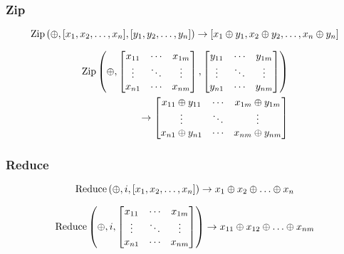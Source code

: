 \subsubsection{Zip}

\begin{equation}
\operatorname*{Zip}\left( \oplus, [x_1,x_2,\ldots,x_n], [y_1,y_2,\ldots,y_n] \right)
\to
\left[ x_1 \oplus y_1, x_2 \oplus y_2, \ldots, x_n \oplus y_n \right]
\end{equation}

\begin{equation}
\begin{split}
\operatorname*{Zip} \left( \oplus,
\begin{bmatrix}
  x_{11} & \cdots & x_{1m} \\
  \vdots & \ddots & \vdots \\
  x_{n1} & \cdots & x_{nm}
\end{bmatrix},
\begin{bmatrix}
  y_{11} & \cdots & y_{1m} \\
  \vdots & \ddots & \vdots \\
  y_{n1} & \cdots & y_{nm}
\end{bmatrix} \right) \\
\to
\begin{bmatrix}
  x_{11} \oplus y_{11} & \cdots & x_{1m} \oplus y_{1m} \\
  \vdots & \ddots & \vdots \\
  x_{n1} \oplus y_{n1} & \cdots & x_{nm} \oplus y_{nm}
\end{bmatrix}
\end{split}
\end{equation}

\subsubsection{Reduce}

\begin{equation}
\operatorname*{Reduce} \left( \oplus, i, [x_1,x_2,\ldots,x_n] \right)
\to
x_1 \oplus x_2 \oplus \ldots \oplus x_n
\end{equation}

\begin{equation}
\operatorname*{Reduce} \left( \oplus, i,
\begin{bmatrix}
  x_{11} & \cdots & x_{1m} \\
  \vdots & \ddots & \vdots \\
  x_{n1} & \cdots & x_{nm}
\end{bmatrix} \right)
\to
x_{11} \oplus x_{12} \oplus \ldots \oplus x_{nm}
\end{equation}

